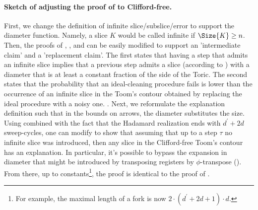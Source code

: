   \paragraph{Sketch of adjusting the proof of  to Clifford-free.}    
First, we change the definition of infinite slice/subslice/error to support the diameter function. Namely, a slice $K$ would be called infinite if $\Size{K} \ge n$. Then, the proofs of , , and  can be easily modified to support an 'intermediate claim' and a 'replacement claim'. The first states that having a step that admits an infinite slice implies that a previous step admits a slice (according to ) with a diameter that is at least a constant fraction of the side of the Toric. The second states that the probability that an ideal-cleaning procedure fails is lower than the occurrence of an infinite slice in the Toom's contour obtained by replacing the ideal procedure with a noisy one.
  .
Next, we reformulate the explanation definition such that in the bounds on arrows, the diameter substitutes the size. Using  combined with the fact that the Hadamard realization ends with $d^{\prime}+2d$ sweep-cycles, one can modify  to show that assuming that up to a step $\tau$ no infinite slice was introduced, then any slice in the Clifford-free Toom's contour has an explanation. In particular, it's possible to bypass the expansion in diameter that might be introduced by transposing registers by $\phi$-transpose (). From there, up to constants\footnote{For example, the maximal length of a fork is now $2 \cdot (d^{\prime}+2d+1) \cdot d$.}, the proof is identical to the proof of .


